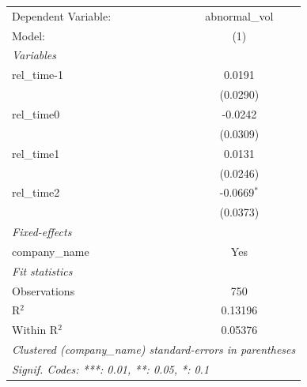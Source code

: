 
\begingroup
\centering
\begin{tabular}{lc}
   \tabularnewline \midrule \midrule
   Dependent Variable: & abnormal\_vol\\   
   Model:              & (1)\\  
   \midrule
   \emph{Variables}\\
   rel\_time-1         & 0.0191\\   
                       & (0.0290)\\   
   rel\_time0          & -0.0242\\   
                       & (0.0309)\\   
   rel\_time1          & 0.0131\\   
                       & (0.0246)\\   
   rel\_time2          & -0.0669$^{*}$\\   
                       & (0.0373)\\   
   \midrule
   \emph{Fixed-effects}\\
   company\_name       & Yes\\  
   \midrule
   \emph{Fit statistics}\\
   Observations        & 750\\  
   R$^2$               & 0.13196\\  
   Within R$^2$        & 0.05376\\  
   \midrule \midrule
   \multicolumn{2}{l}{\emph{Clustered (company\_name) standard-errors in parentheses}}\\
   \multicolumn{2}{l}{\emph{Signif. Codes: ***: 0.01, **: 0.05, *: 0.1}}\\
\end{tabular}
\par\endgroup



